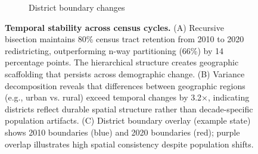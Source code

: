 \begin{figure}[t]
\begin{subfigure}[b]{0.32\textwidth}
\caption{District boundary changes}
\end{subfigure}

\caption{\textbf{Temporal stability across census cycles.} (A) Recursive bisection maintains 80\% census tract retention from 2010 to 2020 redistricting, outperforming n-way partitioning (66\%) by 14 percentage points. The hierarchical structure creates geographic scaffolding that persists across demographic change. (B) Variance decomposition reveals that differences between geographic regions (e.g., urban vs. rural) exceed temporal changes by 3.2×, indicating districts reflect durable spatial structure rather than decade-specific population artifacts. (C) District boundary overlay (example state) shows 2010 boundaries (blue) and 2020 boundaries (red); purple overlap illustrates high spatial consistency despite population shifts.}
\label{fig:temporal}
\end{figure}

